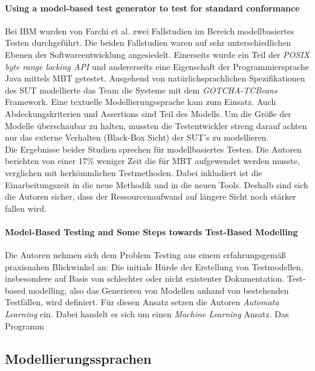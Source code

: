 \paragraph{Using a model-based test generator to test for standard conformance\cite{farchi_using_2002}}\label{sec:ibm_fallstudie}
Bei IBM wurden von Farchi et al. zwei Fallstudien im Bereich modellbasiertes Testen durchgeführt. Die beiden Fallstudien waren auf sehr unterschiedlichen Ebenen der Softwareentwicklung angesiedelt. Einerseits wurde ein Teil der \textit{POSIX byte range locking API}\cite{posix_2008} und andererseits eine Eigenschaft der Programmiersprache Java mittels MBT getestet. Ausgehend von natürlichsprachlichen Spezifikationen des SUT modellierte das Team die Systeme mit dem \textit{GOTCHA-TCBeans} Framework. Eine textuelle Modellierungssprache kam zum Einsatz. Auch Abdeckungskriterien und Assertions sind Teil des Modells. Um die Größe der Modelle überschaubar zu halten, mussten die Testentwickler streng darauf achten nur das externe Verhalten (Black-Box Sicht) der SUT's zu modellieren.\\
Die Ergebnisse beider Studien sprechen für modellbasiertes Testen. Die Autoren berichten von einer 17\% weniger Zeit die für MBT aufgewendet werden musste, verglichen mit herkömmlichen Testmethoden. Dabei inkludiert ist die Einarbeitungszeit in die neue Methodik und in die neuen Tools. Deshalb sind sich die Autoren sicher, dass der Ressourcenaufwand auf längere Sicht noch stärker fallen wird.

\paragraph{Model-Based Testing and Some Steps towards Test-Based Modelling\cite{tretmans_model-based_2011}} Die Autoren nehmen sich dem Problem Testing aus einem erfahrungsgemäß praxisnahen Blickwinkel an: Die initiale Hürde der Erstellung von Testmodellen, insbesondere auf Basis von schlechter oder nicht existenter Dokumentation. Test-based modelling, also das Generieren von Modellen anhand von bestehenden Testfällen, wird definiert. Für diesen Ansatz setzen die Autoren \textit{Automata Learning} ein. Dabei handelt es sich um einen \textit{Machine Learning} Ansatz\cite{narendra_learning_1974}. Das Programm 

\subsection{Modellierungssprachen}
\label{sec:notations}
